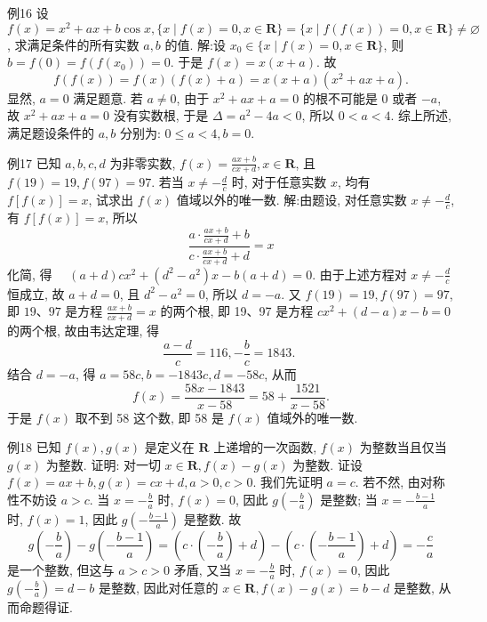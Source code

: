 例16 设 $f(x)=x^2+a x+b \cos x,\{x \mid f(x)=0, x \in \mathbf{R}\}=\{x \mid f(f(x))=0, x \in \mathbf{R}\} \neq \varnothing$, 求满足条件的所有实数 $a, b$ 的值.
解:设 $x_0 \in\{x \mid f(x)=0, x \in \mathbf{R}\}$, 则 $b=f(0)=f\left(f\left(x_0\right)\right)=0$.
于是 $f(x)=x(x+a)$. 故
$$
f(f(x))=f(x)(f(x)+a)=x(x+a)\left(x^2+a x+a\right) .
$$
显然, $a=0$ 满足题意.
若 $a \neq 0$, 由于 $x^2+a x+a=0$ 的根不可能是 0 或者 $-a$, 故 $x^2+a x+a=0$ 没有实数根, 于是 $\Delta=a^2-4 a<0$, 所以 $0<a<4$.
综上所述, 满足题设条件的 $a, b$ 分别为: $0 \leqslant a<4, b=0$.



例17 已知 $a, b, c, d$ 为非零实数, $f(x)=\frac{a x+b}{c x+d}, x \in \mathbf{R}$, 且 $f(19)= 19, f(97)=97$. 若当 $x \neq-\frac{d}{c}$ 时, 对于任意实数 $x$, 均有 $f[f(x)]=x$, 试求出 $f(x)$ 值域以外的唯一数.
解:由题设, 对任意实数 $x \neq-\frac{d}{c}$, 有 $f[f(x)]=x$, 所以
$$
\frac{a \cdot \frac{a x+b}{c x+d}+b}{c \cdot \frac{a x+b}{c x+d}+d}=x
$$
化简, 得 $\quad(a+d) c x^2+\left(d^2-a^2\right) x-b(a+d)=0$.
由于上述方程对 $x \neq-\frac{d}{c}$ 恒成立, 故 $a+d=0$, 且 $d^2-a^2=0$, 所以 $d=-a$. 又 $f(19)=19, f(97)=97$, 即 $19 、 97$ 是方程 $\frac{a x+b}{c x+d}=x$ 的两个根, 即
19、97 是方程 $c x^2+(d-a) x-b=0$ 的两个根, 故由韦达定理, 得
$$
\frac{a-d}{c}=116,-\frac{b}{c}=1843 \text {. }
$$
结合 $d=-a$, 得 $a=58 c, b=-1843 c, d=-58 c$, 从而
$$
f(x)=\frac{58 x-1843}{x-58}=58+\frac{1521}{x-58} .
$$
于是 $f(x)$ 取不到 58 这个数, 即 58 是 $f(x)$ 值域外的唯一数.



例18 已知 $f(x), g(x)$ 是定义在 $\mathbf{R}$ 上递增的一次函数, $f(x)$ 为整数当且仅当 $g(x)$ 为整数.
证明: 对一切 $x \in \mathbf{R}, f(x)-g(x)$ 为整数.
证设 $f(x)=a x+b, g(x)=c x+d, a>0, c>0$. 我们先证明 $a=c$.
若不然, 由对称性不妨设 $a>c$.
当 $x=-\frac{b}{a}$ 时, $f(x)=0$, 因此 $g\left(-\frac{b}{a}\right)$ 是整数; 当 $x=-\frac{b-1}{a}$ 时, $f(x)=1$, 因此 $g\left(-\frac{b-1}{a}\right)$ 是整数.
故
$$
g\left(-\frac{b}{a}\right)-g\left(-\frac{b-1}{a}\right)=\left(c \cdot\left(-\frac{b}{a}\right)+d\right)-\left(c \cdot\left(-\frac{b-1}{a}\right)+d\right)=-\frac{c}{a}
$$
是一个整数, 但这与 $a>c>0$ 矛盾, 又当 $x=-\frac{b}{a}$ 时, $f(x)=0$, 因此 $g\left(-\frac{b}{a}\right)=d-b$ 是整数, 因此对任意的 $x \in \mathbf{R}, f(x)-g(x)=b-d$ 是整数, 从而命题得证.


